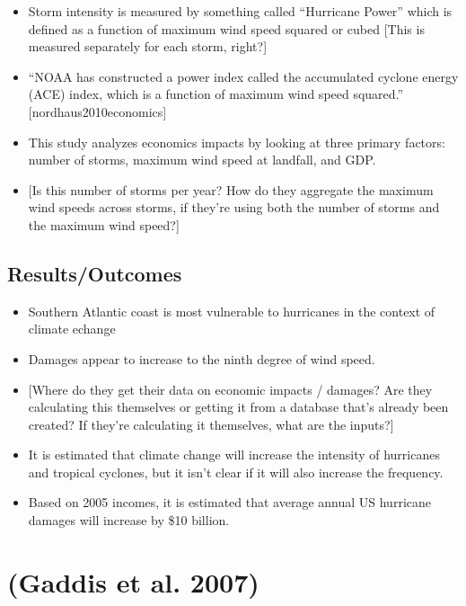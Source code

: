 \documentclass[
]{article}
\providecommand{\tightlist}{%
  \setlength{\itemsep}{0pt}\setlength{\parskip}{0pt}}
\begin{document}
\begin{itemize}
\tightlist
\item
  Storm intensity is measured by something called ``Hurricane Power''
  which is defined as a function of maximum wind speed squared or cubed
  {[}This is measured separately for each storm, right?{]}
\item
  ``NOAA has constructed a power index called the accumulated cyclone
  energy (ACE) index, which is a function of maximum wind speed
  squared.'' {[}nordhaus2010economics{]}
\item
  This study analyzes economics impacts by looking at three primary
  factors: number of storms, maximum wind speed at landfall, and GDP.
\item
  {[}Is this number of storms per year? How do they aggregate the
  maximum wind speeds across storms, if they're using both the number of
  storms and the maximum wind speed?{]}
\end{itemize}

\hypertarget{resultsoutcomes-14}{%
\subsection{Results/Outcomes}\label{resultsoutcomes-14}}

\begin{itemize}
\tightlist
\item
  Southern Atlantic coast is most vulnerable to hurricanes in the
  context of climate echange
\item
  Damages appear to increase to the ninth degree of wind speed.
\item
  {[}Where do they get their data on economic impacts / damages? Are
  they calculating this themselves or getting it from a database that's
  already been created? If they're calculating it themselves, what are
  the inputs?{]}
\item
  It is estimated that climate change will increase the intensity of
  hurricanes and tropical cyclones, but it isn't clear if it will also
  increase the frequency.
\item
  Based on 2005 incomes, it is estimated that average annual US
  hurricane damages will increase by \$10 billion.
\end{itemize}

\hypertarget{gaddis2007full}{%
\section{(Gaddis et al. 2007)}\label{gaddis2007full}}
\end{document}
